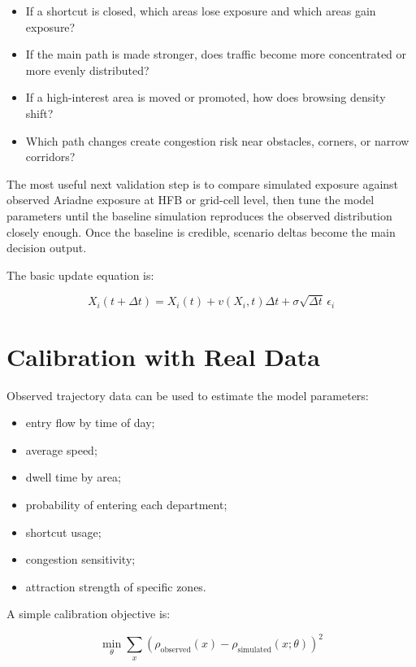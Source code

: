 \documentclass[11pt,a4paper]{article}
\begin{document}
\begin{itemize}[leftmargin=*]
    \item If a shortcut is closed, which areas lose exposure and which areas gain exposure?
    \item If the main path is made stronger, does traffic become more concentrated or more evenly distributed?
    \item If a high-interest area is moved or promoted, how does browsing density shift?
    \item Which path changes create congestion risk near obstacles, corners, or narrow corridors?
\end{itemize}

The most useful next validation step is to compare simulated exposure against observed Ariadne exposure at HFB or grid-cell level, then tune the model parameters until the baseline simulation reproduces the observed distribution closely enough. Once the baseline is credible, scenario deltas become the main decision output.

The basic update equation is:

\begin{equation}
X_i(t+\Delta t) = X_i(t) + v(X_i,t)\Delta t + \sigma \sqrt{\Delta t}\,\epsilon_i
\end{equation}

\section{Calibration with Real Data}

Observed trajectory data can be used to estimate the model parameters:

\begin{itemize}[leftmargin=*]
    \item entry flow by time of day;
    \item average speed;
    \item dwell time by area;
    \item probability of entering each department;
    \item shortcut usage;
    \item congestion sensitivity;
    \item attraction strength of specific zones.
\end{itemize}

A simple calibration objective is:

\begin{equation}
\min_{\theta} \sum_x \left( \rho_{\text{observed}}(x) - \rho_{\text{simulated}}(x;\theta) \right)^2
\end{equation}
\end{document}
